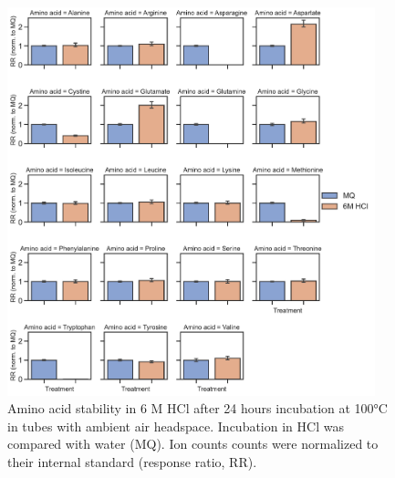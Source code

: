 \begin{figure}[ht]
    \centering
    \includegraphics[width=0.95\textwidth]{figures/chap2/app/AA_acid_hydrolysis_stability.pdf}
    \caption[Amino acid stability in HCl.]{
    Amino acid stability in 6 M HCl after 24 hours incubation at 100°C in tubes with ambient air headspace.
    Incubation in HCl was compared with water (MQ).
    Ion counts counts were normalized to their internal standard (response ratio, RR).
    }
    \label{fig:app_ch2:AA_acid_hydrolysis_stability}
\end{figure}

